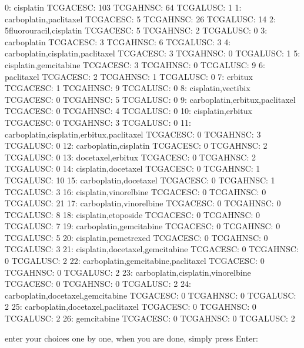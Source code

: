 \documentclass[letterpaper,10pt,english]{sphinxmanual}
\begin{document}
\begin{sphinxVerbatim}[commandchars=\\\{\}]
 0: cisplatin                                TCGA\PYGZhy{}CESC: 103 TCGA\PYGZhy{}HNSC: 64 TCGA\PYGZhy{}LUSC: 1
 1: carboplatin,paclitaxel                   TCGA\PYGZhy{}CESC: 5 TCGA\PYGZhy{}HNSC: 26 TCGA\PYGZhy{}LUSC: 14
 2: 5\PYGZhy{}fluorouracil,cisplatin                 TCGA\PYGZhy{}CESC: 5 TCGA\PYGZhy{}HNSC: 2 TCGA\PYGZhy{}LUSC: 0
 3: carboplatin                              TCGA\PYGZhy{}CESC: 3 TCGA\PYGZhy{}HNSC: 6 TCGA\PYGZhy{}LUSC: 3
 4: carboplatin,cisplatin,paclitaxel         TCGA\PYGZhy{}CESC: 3 TCGA\PYGZhy{}HNSC: 0 TCGA\PYGZhy{}LUSC: 1
 5: cisplatin,gemcitabine                    TCGA\PYGZhy{}CESC: 3 TCGA\PYGZhy{}HNSC: 0 TCGA\PYGZhy{}LUSC: 9
 6: paclitaxel                               TCGA\PYGZhy{}CESC: 2 TCGA\PYGZhy{}HNSC: 1 TCGA\PYGZhy{}LUSC: 0
 7: erbitux                                  TCGA\PYGZhy{}CESC: 1 TCGA\PYGZhy{}HNSC: 9 TCGA\PYGZhy{}LUSC: 0
 8: cisplatin,vectibix                       TCGA\PYGZhy{}CESC: 0 TCGA\PYGZhy{}HNSC: 5 TCGA\PYGZhy{}LUSC: 0
 9: carboplatin,erbitux,paclitaxel           TCGA\PYGZhy{}CESC: 0 TCGA\PYGZhy{}HNSC: 4 TCGA\PYGZhy{}LUSC: 0
10: cisplatin,erbitux                        TCGA\PYGZhy{}CESC: 0 TCGA\PYGZhy{}HNSC: 3 TCGA\PYGZhy{}LUSC: 0
11: carboplatin,cisplatin,erbitux,paclitaxel TCGA\PYGZhy{}CESC: 0 TCGA\PYGZhy{}HNSC: 3 TCGA\PYGZhy{}LUSC: 0
12: carboplatin,cisplatin                    TCGA\PYGZhy{}CESC: 0 TCGA\PYGZhy{}HNSC: 2 TCGA\PYGZhy{}LUSC: 0
13: docetaxel,erbitux                        TCGA\PYGZhy{}CESC: 0 TCGA\PYGZhy{}HNSC: 2 TCGA\PYGZhy{}LUSC: 0
14: cisplatin,docetaxel                      TCGA\PYGZhy{}CESC: 0 TCGA\PYGZhy{}HNSC: 1 TCGA\PYGZhy{}LUSC: 10
15: carboplatin,docetaxel                    TCGA\PYGZhy{}CESC: 0 TCGA\PYGZhy{}HNSC: 1 TCGA\PYGZhy{}LUSC: 3
16: cisplatin,vinorelbine                    TCGA\PYGZhy{}CESC: 0 TCGA\PYGZhy{}HNSC: 0 TCGA\PYGZhy{}LUSC: 21
17: carboplatin,vinorelbine                  TCGA\PYGZhy{}CESC: 0 TCGA\PYGZhy{}HNSC: 0 TCGA\PYGZhy{}LUSC: 8
18: cisplatin,etoposide                      TCGA\PYGZhy{}CESC: 0 TCGA\PYGZhy{}HNSC: 0 TCGA\PYGZhy{}LUSC: 7
19: carboplatin,gemcitabine                  TCGA\PYGZhy{}CESC: 0 TCGA\PYGZhy{}HNSC: 0 TCGA\PYGZhy{}LUSC: 5
20: cisplatin,pemetrexed                     TCGA\PYGZhy{}CESC: 0 TCGA\PYGZhy{}HNSC: 0 TCGA\PYGZhy{}LUSC: 3
21: cisplatin,docetaxel,gemcitabine          TCGA\PYGZhy{}CESC: 0 TCGA\PYGZhy{}HNSC: 0 TCGA\PYGZhy{}LUSC: 2
22: carboplatin,gemcitabine,paclitaxel       TCGA\PYGZhy{}CESC: 0 TCGA\PYGZhy{}HNSC: 0 TCGA\PYGZhy{}LUSC: 2
23: carboplatin,cisplatin,vinorelbine        TCGA\PYGZhy{}CESC: 0 TCGA\PYGZhy{}HNSC: 0 TCGA\PYGZhy{}LUSC: 2
24: carboplatin,docetaxel,gemcitabine        TCGA\PYGZhy{}CESC: 0 TCGA\PYGZhy{}HNSC: 0 TCGA\PYGZhy{}LUSC: 2
25: carboplatin,docetaxel,paclitaxel         TCGA\PYGZhy{}CESC: 0 TCGA\PYGZhy{}HNSC: 0 TCGA\PYGZhy{}LUSC: 2
26: gemcitabine                              TCGA\PYGZhy{}CESC: 0 TCGA\PYGZhy{}HNSC: 0 TCGA\PYGZhy{}LUSC: 2

enter your choices one by one, when you are done, simply press \PYGZdq{}Enter\PYGZdq{}:
\end{sphinxVerbatim}
\end{document}
